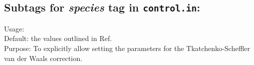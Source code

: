 \newpage

\subsection*{Subtags for \emph{species} tag in \texttt{control.in}:}

{
  \noindent
  Usage:     \\[1.0ex]
  Default: the values outlined in Ref.~\cite{TS-vdw} \\
  Purpose: To explicitly allow setting the parameters for the Tkatchenko-Scheffler van der Waals correction.
}
